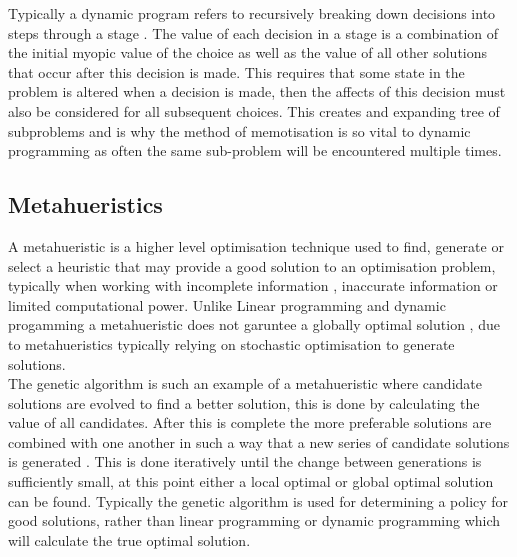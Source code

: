 Typically a dynamic program refers to recursively breaking down decisions into steps through a stage \cite{DPfound}. The value of each decision in a stage is a combination of the initial myopic value of the choice as well as the value of all other solutions that occur after this decision is made\cite{DPfound}. This requires that some state in the problem is altered when a decision is made, then the affects of this decision must also be considered for all subsequent choices. This creates and expanding tree of subproblems and is why the method of memotisation is so vital to dynamic programming as often the same sub-problem will be encountered multiple times\cite{Bellman}. 
\subsection{Metahueristics} %
A metahueristic is a higher level optimisation technique used to find, generate or select a heuristic that may provide a good solution to an optimisation problem\cite{Meta}, typically when working with incomplete information , inaccurate information or limited computational power\cite{Meta}. Unlike Linear programming and dynamic progamming a metahueristic does not garuntee a globally optimal solution , due to metahueristics typically relying on stochastic optimisation to generate solutions. \\
The genetic algorithm is such an example of a metahueristic where candidate solutions are evolved to find a better solution\cite{GA}, this is done by calculating the value of all candidates. After this is complete the more preferable solutions are combined with one another in such a way that a new series of candidate solutions is generated \cite{GA}. This is done iteratively until the change between generations is sufficiently small, at this point either a local optimal or global optimal solution can be found. Typically the genetic algorithm is used for determining a policy for good solutions, rather than linear programming or dynamic programming which will calculate the true optimal solution. 
